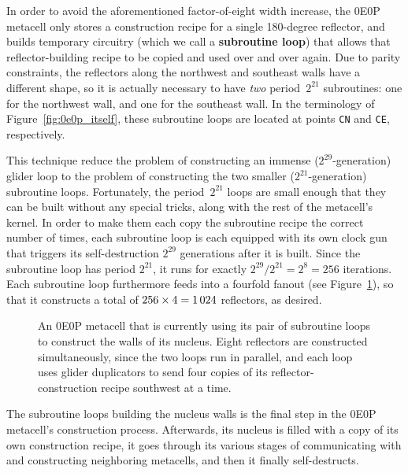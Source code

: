 In order to avoid the aforementioned factor-of-eight width increase, the 0E0P metacell only stores a construction recipe for a single 180-degree reflector, and builds temporary circuitry (which we call a \textbf{subroutine loop}) that allows that reflector-building recipe to be copied and used over and over again. Due to parity constraints, the reflectors along the northwest and southeast walls have a different shape, so it is actually necessary to have \emph{two} period~$2^{21}$ subroutines: one for the northwest wall, and one for the southeast wall. In the terminology of Figure~\ref{fig:0e0p_itself}, these subroutine loops are located at points \texttt{CN} and \texttt{CE}, respectively.

This technique reduce the problem of constructing an immense ($2^{29}$-generation) glider loop to the problem of constructing the two smaller ($2^{21}$-generation) subroutine loops. Fortunately, the period~$2^{21}$ loops are small enough that they can be built without any special tricks, along with the rest of the metacell's kernel. In order to make them each copy the subroutine recipe the correct number of times, each subroutine loop is each equipped with its own clock gun that triggers its self-destruction $2^{29}$ generations after it is built. Since the subroutine loop has period $2^{21}$, it runs for exactly $2^{29}/2^{21} = 2^8 = 256$ iterations. Each subroutine loop furthermore feeds into a fourfold fanout (see Figure~\ref{fig:0e0p_subroutine}), so that it constructs a total of $256 \times 4 = 1{\,}024$ reflectors, as desired.

\begin{figure}[!htb]
	\centering
		\caption{An 0E0P metacell that is currently using its pair of subroutine loops to construct the walls of its nucleus. Eight reflectors are constructed simultaneously, since the two loops run in parallel, and each loop uses glider duplicators to send four copies of its reflector-construction recipe southwest at a time.}\label{fig:0e0p_subroutine}
\end{figure}

The subroutine loops building the nucleus walls is the final step in the 0E0P metacell's construction process. Afterwards, its nucleus is filled with a copy of its own construction recipe, it goes through its various stages of communicating with and constructing neighboring metacells, and then it finally self-destructs.


